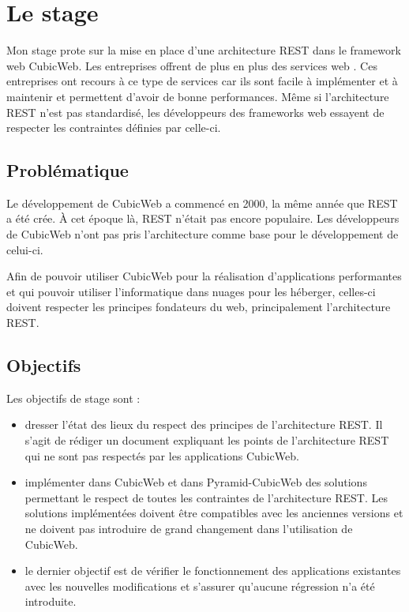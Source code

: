 \chapter{Le stage}
Mon stage prote sur la mise en place d'une architecture REST dans le framework web CubicWeb. Les entreprises offrent de plus en plus des services web . Ces entreprises ont recours à ce type de services car ils sont facile à implémenter et à maintenir et permettent d'avoir de bonne performances. Même si l'architecture REST n'est pas standardisé, les développeurs des frameworks web essayent de respecter les contraintes définies par celle-ci.  
\section{Problématique}
Le développement de CubicWeb a commencé en 2000, la même année que REST a été crée. \`A cet époque là, REST n'était pas encore populaire. Les développeurs de CubicWeb n'ont pas pris l'architecture comme base pour le développement de celui-ci.  

Afin de pouvoir utiliser CubicWeb pour la réalisation d'applications 	performantes et qui pouvoir utiliser l'informatique dans nuages pour les héberger, celles-ci doivent respecter les principes fondateurs du web, principalement l'architecture REST.


\section{Objectifs}
Les objectifs de stage sont :
\begin{itemize}
	\item dresser l'état des lieux du respect des principes de l'architecture REST. Il s'agit de rédiger un document expliquant les points de l'architecture REST qui ne sont pas respectés par les applications CubicWeb.
	
	\item implémenter dans CubicWeb et dans Pyramid-CubicWeb des solutions permettant le respect de toutes les contraintes de l'architecture REST.  Les solutions implémentées doivent être compatibles avec les anciennes versions et ne doivent pas introduire de grand changement dans l'utilisation de CubicWeb.
	
	\item le dernier objectif est de vérifier le fonctionnement des applications existantes avec les nouvelles modifications et s'assurer qu'aucune régression n'a été introduite. 
\end{itemize}